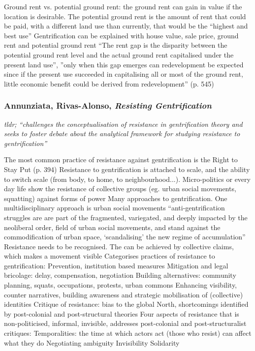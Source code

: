 \documentclass{article}
\begin{document}
\begin{outline}
	\1 Ground rent vs. potential ground rent: the ground rent can gain in value if the location is desirable. The potential ground rent is the amount of rent that could be paid, with a different land use than currently, that would be the ``highest and best use''
	\1 Gentrification can be explained with house value, sale price, ground rent and potential ground rent
	\1 ``The rent gap is the disparity between the potential ground rent level and the actual ground rent capitalised under the present land use'', ''only when this gap emerges can redevelopment be expected since if the present use succeeded in capitalising all or most of the ground rent, little economic benefit could be derived from redevelopment'' (p. 545)
\end{outline}

\subsubsection{Annunziata, Rivas-Alonso, \textit{Resisting Gentrification}}

\textit{tldr; ``challenges the conceptualisation of resistance in gentrification theory and seeks to foster debate about the analytical framework for studying resistance to gentrification''}

\begin{outline}
	\1 The most common practice of resistance against gentrification is the Right to Stay Put (p. 394)
	\1 Resistance to gentrification is attached to scale, and the ability to switch scale (from body, to home, to neighbourhood...). Micro-politics or every day life show the resistance of collective groups (eg. urban social movements, squatting) against forms of power
	\1 Many approaches to gentrification. One multidisciplinary approach is urban social movements
		\2 ``anti-gentrification struggles are are part of the fragmented, variegated, and deeply impacted by the neoliberal order, field of urban social movements, and stand against the commodification of urban space, `scandalising' the new regime of accumulation''
		\2 Resistance needs to be recognised. The can be achieved by collective claims, which makes a movement visible
	\1 Categorises practices of resistance to gentrification:
		\2 Prevention, institution based measures
		\2 Mitigation and legal bricolage: delay, compensation, negotiation
		\2 Building alternatives: community planning, squats, occupations, protests, urban commons
		\2 Enhancing visibility, counter narratives, building awareness and strategic mobilisation of (collective) identities
	\1 Critique of resistance: bias to the global North, shortcomings identified by post-colonial and post-structural theories
	\1 Four aspects of resistance that is non-politicised, informal, invisible, addresses post-colonial and post-structuralist critiques:
		\2 Temporalities: the time at which actors act (those who resist) can affect what they do
		\2 Negotiating ambiguity
		\2 Invisibility
		\2 Solidarity
\end{outline}
\end{document}
